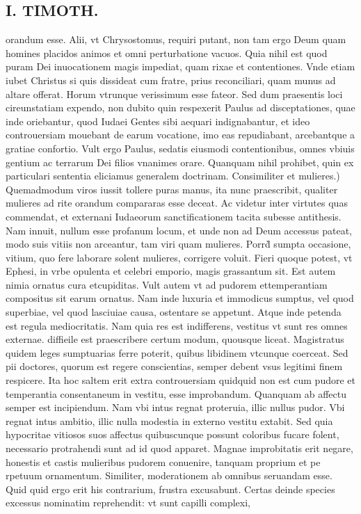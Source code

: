 \documentclass{article}
\begin{document}
\begin{pages}
\section*{I. TIMOTH. }
\marginpar{[ p.26 ]}\pstart orandum esse. Alii, vt Chrysostomus, requiri putant, non tam ergo Deum quam homines placidos animos et omni perturbatione vacuos. Quia nihil est quod puram Dei inuocationem magis impediat, quam rixae et contentiones. Vnde etiam iubet Christus si quis dissideat cum fratre, prius reconciliari, quam munus ad altare offerat. Horum vtrunque verissimum esse fateor. Sed dum praesentis loci cireunstatiam expendo, non dubito quin respexerit Paulus ad disceptationes, quae inde oriebantur, quod Iudaei Gentes sibi aequari indignabantur, et ideo controuersiam mouebant de earum vocatione, imo eas repudiabant, arcebantque a gratiae confortio. Vult ergo Paulus, sedatis eiusmodi contentionibus, omnes vbiuis gentium ac terrarum Dei filios vnanimes orare. Quanquam nihil prohibet, quin ex particulari sententia eliciamus generalem doctrinam.  \pend\pstart Consimiliter et mulieres.) Quemadmodum viros iussit tollere puras manus, ita nunc praescribit, qualiter mulieres ad rite orandum compararas esse deceat. Ac videtur inter virtutes quas commendat, et externani Iudaeorum sanctificationem tacita subesse antithesis. Nam innuit, nullum esse profanum locum, et unde non ad Deum accessus pateat, modo suis vitiis non arceantur, tam viri quam mulieres. Porrd̀ sumpta occasione, vitium, quo fere laborare solent mulieres, corrigere voluit. Fieri quoque potest, vt Ephesi, in vrbe opulenta et celebri emporio, magis grassantum sit. Est autem nimia ornatus cura etcupiditas. Vult autem vt ad pudorem ettemperantiam compositus sit earum ornatus. Nam inde luxuria et immodicus sumptus, vel quod superbiae, vel quod lasciuiae causa, ostentare se appetunt. Atque inde petenda est regula mediocritatis. Nam quia res est indifferens, vestitus vt sunt res omnes externae. diffieile est praescribere certum modum, quousque liceat. Magistratus quidem leges sumptuarias ferre poterit, quibus libidinem vtcunque coerceat. Sed pii doctores, quorum est regere conscientias, semper debent vsus legitimi finem respicere. Ita hoc saltem erit extra controuersiam quidquid non est cum pudore et temperantia consentaneum in vestitu, esse improbandum. Quanquam ab affectu semper est incipiendum. Nam vbi intus regnat proteruia, illic nullus pudor. Vbi regnat intus ambitio, illic nulla modestia in externo vestitu extabit. Sed quia hypocritae vitiosos suos affectus quibuscunque possunt coloribus fucare folent, necessario protrahendi sunt ad id quod apparet. Magnae improbitatis erit negare, honestis et castis mulieribus pudorem conuenire, tanquam proprium et pe rpetuum ornamentum. Similiter, moderationem ab omnibus seruandam esse. Quid quid ergo erit his contrarium, frustra excusabunt. Certas deinde species excessus nominatim reprehendit: vt sunt capilli complexi,  \pend

\end{pages}
\end{document}
